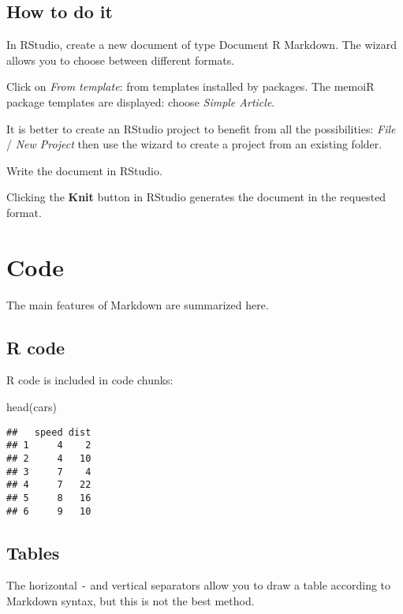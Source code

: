 \documentclass[fleqn,]{article} %
\newenvironment{Shaded}{\begin{snugshade}}{\end{snugshade}}
\newcommand{\FunctionTok}[1]{\textcolor[rgb]{0.00,0.00,0.00}{{#1}}}
\newcommand{\NormalTok}[1]{{#1}}
\begin{document}
\subsection{How to do it}\label{how-to-do-it}

In RStudio, create a new document of type Document R Markdown.
The wizard allows you to choose between different formats.

Click on \emph{From template}: from templates installed by packages.
The memoiR package templates are displayed: choose \emph{Simple Article}.

It is better to create an RStudio project to benefit from all the possibilities: \emph{File} / \emph{New Project} then use the wizard to create a project from an existing folder.

Write the document in RStudio.

Clicking the \textbf{Knit} button in RStudio generates the document in the requested format.

\section{Code}\label{code}

The main features of Markdown are summarized here.

\subsection{R code}\label{r-code}

R code is included in code chunks:

\scriptsize

\begin{Shaded}
\begin{Highlighting}[]
\FunctionTok{head}\NormalTok{(cars)}
\end{Highlighting}
\end{Shaded}

\begin{verbatim}
##   speed dist
## 1     4    2
## 2     4   10
## 3     7    4
## 4     7   22
## 5     8   16
## 6     9   10
\end{verbatim}

\normalsize

\subsection{Tables}\label{tables}

The horizontal \texttt{-} and vertical separators \texttt{\textbar{}} allow you to draw a table according to Markdown syntax, but this is not the best method.
\end{document}
